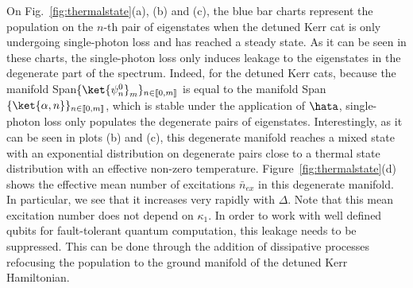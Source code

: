 On Fig.~\ref{fig:thermalstate}(a), (b) and (c), the blue bar charts represent the population on the $n$-th pair of eigenstates when the detuned Kerr cat is only undergoing single-photon loss and has reached a steady state. As it can be seen in these charts, the single-photon loss only induces leakage to the eigenstates in the degenerate part of the spectrum. Indeed, for the detuned Kerr cats, because the manifold Span$\{{\ket{\psi^0_n}}_m\}_{n\in  [\![ 0,m]\!]}$ is equal to the manifold Span$\{{\ket{\alpha,n}}\}_{n\in  [\![ 0,m]\!]}$, which is stable under the application of $\hata$, single-photon loss only populates the degenerate pairs of eigenstates. Interestingly, as it can be seen in plots (b) and (c), this degenerate manifold reaches a mixed state with an  exponential distribution on degenerate pairs close to a thermal state distribution with an effective non-zero temperature.  Figure~\ref{fig:thermalstate}(d) shows the effective mean number of excitations $\bar n_{ex}$ in this degenerate manifold. In particular, we see that it increases very rapidly with $\Delta$. Note that this mean excitation number does not depend on $\kappa_1$. In order to work with well defined qubits for fault-tolerant quantum computation, this leakage needs to be suppressed. This can be done through the addition of dissipative processes refocusing the population to the ground manifold of the detuned Kerr Hamiltonian. 

